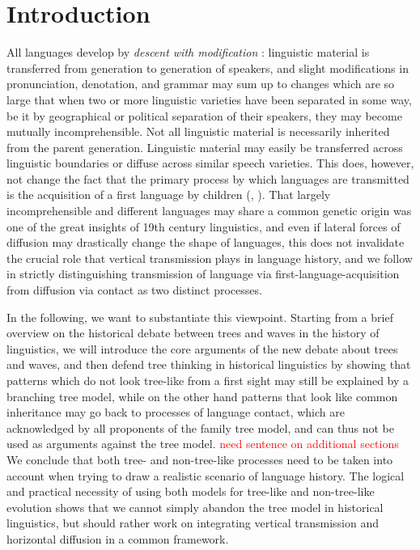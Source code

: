 \documentclass[svgnames,12pt]{scrartcl}
\begin{document}
\section{Introduction}
All languages develop by \emph{descent with modification} \citep{Darwin1859}: linguistic material is transferred from
generation to generation of speakers, and slight modifications in pronunciation, denotation, and
grammar may sum up to changes which are so large that when two or more linguistic varieties have
been separated in some way, be it by geographical or political separation of their speakers, they
may become mutually incomprehensible. Not all linguistic material is necessarily inherited from the
parent generation. Linguistic material may easily be transferred across linguistic boundaries or
diffuse across similar speech varieties. This does, however, not change the fact that the primary
process by which languages are transmitted is the acquisition of a first language by children
(\citealt[61]{Ringe2002}, \citealt[27-48]{Hale2007}). That largely incomprehensible and different languages may share a common
genetic origin was one of the great insights of 19th century linguistics, and even if lateral forces
of diffusion may drastically change the shape of languages, this does not invalidate the crucial
role that vertical transmission plays in language history, and we follow \citet[347]{Labov2007} in
strictly distinguishing transmission of language via first-language-acquisition from diffusion via
contact as two distinct processes. 
 
In the following, we want to substantiate this viewpoint. Starting from a brief overview on the
historical debate between trees and waves in the history of linguistics, we will introduce the core
arguments of the new debate about trees and waves, and then defend tree thinking in historical
linguistics by showing that patterns which do not look tree-like from a first sight may still be
explained by a branching tree model, while on the other hand patterns that look like common
inheritance may go back to processes of language contact, which are acknowledged by all proponents
of the family tree model, and can thus not be used as arguments against the tree model.
\textcolor{red}{need sentence on additional sections} We conclude
that both tree- and non-tree-like processes need to be taken into account when trying to draw a
realistic scenario of language history. The logical and practical necessity of using both models for
tree-like and non-tree-like evolution shows that we cannot simply abandon the tree model in
historical linguistics, but should rather work on integrating vertical transmission and horizontal
diffusion in a common framework.
\end{document}
